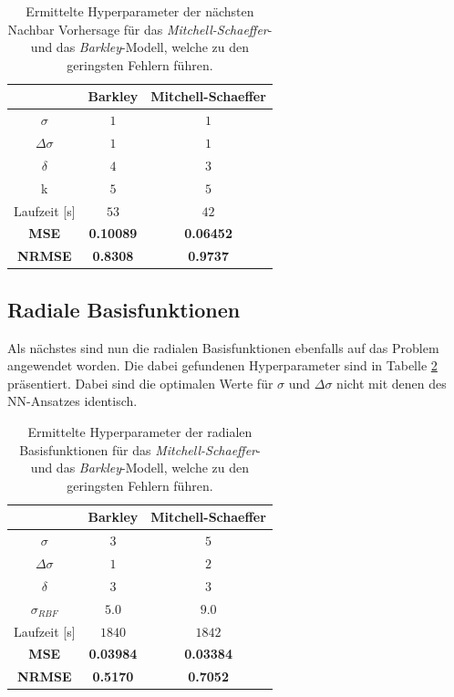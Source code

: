 \begin{table}[h]
	\centering

	\begin{tabular}{ccc}
		\hline		
		\multicolumn{1}{c}{} & Barkley & Mitchell-Schaeffer \\ 
		\hline 
		\rule[-1ex]{0pt}{2.5ex} $\sigma$ & $1$ & $1$ \\ 
		\rule[-1ex]{0pt}{2.5ex} $\Delta \sigma$ & $1$ & $1$ \\ 
		\rule[-1ex]{0pt}{2.5ex} $\delta$ & $4$ & $3$ \\ 
		\rule[-1ex]{0pt}{2.5ex} k & $5$ & $5$ \\ 
		\rule[-1ex]{0pt}{2.5ex} Laufzeit [s] & $53$ & $42$ \\ 
		\rule[-1ex]{0pt}{2.5ex} \textbf{MSE} & \textbf{0.10089} & \textbf{0.06452} \\ 
		\rule[-1ex]{0pt}{2.5ex} \textbf{NRMSE} & \textbf{0.8308} & \textbf{0.9737} \\ 
		\hline 
	\end{tabular} 

	\caption{Ermittelte Hyperparameter der nächsten Nachbar Vorhersage für das \textit{Mitchell-Schaeffer}- und das \textit{Barkley}-Modell, welche zu den geringsten Fehlern führen.}
\label{tab:exp_unblur_nn_results}
\end{table} 


\FloatBarrier
\subsection{Radiale Basisfunktionen}
Als nächstes sind nun die radialen Basisfunktionen ebenfalls auf das Problem angewendet worden. Die dabei gefundenen Hyperparameter sind in Tabelle \ref{tab:exp_unblur_rbf_results} präsentiert. Dabei sind die optimalen Werte für $\sigma$ und $\Delta \sigma$ nicht mit denen des \textsc{NN}-Ansatzes identisch.

\begin{table}[h]
	\centering

	\begin{tabular}{ccc}
		\hline
		\multicolumn{1}{c}{} & Barkley & Mitchell-Schaeffer \\ 
		\hline 
		\rule[-1ex]{0pt}{2.5ex} $\sigma$ & $3$ & $5$ \\ 
		\rule[-1ex]{0pt}{2.5ex} $\Delta \sigma$ & $1$ & $2$ \\ 
		\rule[-1ex]{0pt}{2.5ex} $\delta$ & $3$ & $3$ \\ 
		\rule[-1ex]{0pt}{2.5ex} $\sigma_{RBF}$ & $5.0$ & $9.0$ \\ 
		\rule[-1ex]{0pt}{2.5ex} Laufzeit [s] & $1840$ & $1842$ \\ 
		\rule[-1ex]{0pt}{2.5ex} \textbf{MSE} & \textbf{0.03984} & \textbf{0.03384} \\ 
		\rule[-1ex]{0pt}{2.5ex} \textbf{NRMSE} & \textbf{0.5170} & \textbf{0.7052} \\ 
		\hline 
	\end{tabular} 
	\caption{Ermittelte Hyperparameter der radialen Basisfunktionen für das \textit{Mitchell-Schaeffer}- und das \textit{Barkley}-Modell, welche zu den geringsten Fehlern führen.}
	\label{tab:exp_unblur_rbf_results}
\end{table} 


